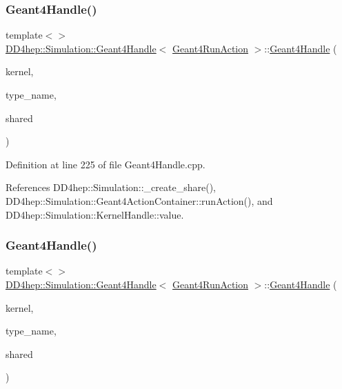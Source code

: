 \subsubsection{\texorpdfstring{Geant4\+Handle()}{Geant4Handle()}\hspace{0.1cm}{\footnotesize\ttfamily [8/20]}}
{\footnotesize\ttfamily template$<$$>$ \\
\hyperlink{class_d_d4hep_1_1_simulation_1_1_geant4_handle}{D\+D4hep\+::\+Simulation\+::\+Geant4\+Handle}$<$ \hyperlink{class_d_d4hep_1_1_simulation_1_1_geant4_run_action}{Geant4\+Run\+Action} $>$\+::\hyperlink{class_d_d4hep_1_1_simulation_1_1_geant4_handle}{Geant4\+Handle} (\begin{DoxyParamCaption}\item[{\hyperlink{class_d_d4hep_1_1_simulation_1_1_geant4_kernel}{Geant4\+Kernel} \&}]{kernel,  }\item[{const string \&}]{type\+\_\+name,  }\item[{bool}]{shared }\end{DoxyParamCaption})}



Definition at line 225 of file Geant4\+Handle.\+cpp.



References D\+D4hep\+::\+Simulation\+::\+\_\+create\+\_\+share(), D\+D4hep\+::\+Simulation\+::\+Geant4\+Action\+Container\+::run\+Action(), and D\+D4hep\+::\+Simulation\+::\+Kernel\+Handle\+::value.

\hypertarget{class_d_d4hep_1_1_simulation_1_1_geant4_handle_a58e768bc8de27fd5facf9ab711ab480b}{}\label{class_d_d4hep_1_1_simulation_1_1_geant4_handle_a58e768bc8de27fd5facf9ab711ab480b} 
\subsubsection{\texorpdfstring{Geant4\+Handle()}{Geant4Handle()}\hspace{0.1cm}{\footnotesize\ttfamily [9/20]}}
{\footnotesize\ttfamily template$<$$>$ \\
\hyperlink{class_d_d4hep_1_1_simulation_1_1_geant4_handle}{D\+D4hep\+::\+Simulation\+::\+Geant4\+Handle}$<$ \hyperlink{class_d_d4hep_1_1_simulation_1_1_geant4_run_action}{Geant4\+Run\+Action} $>$\+::\hyperlink{class_d_d4hep_1_1_simulation_1_1_geant4_handle}{Geant4\+Handle} (\begin{DoxyParamCaption}\item[{\hyperlink{class_d_d4hep_1_1_simulation_1_1_geant4_kernel}{Geant4\+Kernel} \&}]{kernel,  }\item[{const char $\ast$}]{type\+\_\+name,  }\item[{bool}]{shared }\end{DoxyParamCaption})}



